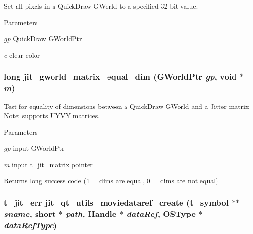 Set all pixels in a QuickDraw GWorld to a specified 32-\/bit value. 
\begin{DoxyParams}{Parameters}
\item[{\em gp}]QuickDraw GWorldPtr \item[{\em c}]clear color \end{DoxyParams}
\hypertarget{group__qtutilsmod_ga96b18f81671878671095be4b05443b11}{
\subsubsection[{jit\_\-gworld\_\-matrix\_\-equal\_\-dim}]{\setlength{\rightskip}{0pt plus 5cm}long jit\_\-gworld\_\-matrix\_\-equal\_\-dim (GWorldPtr {\em gp}, \/  void $\ast$ {\em m})}}
\label{group__qtutilsmod_ga96b18f81671878671095be4b05443b11}


Test for equality of dimensions between a QuickDraw GWorld and a Jitter matrix Note: supports UYVY matrices. 
\begin{DoxyParams}{Parameters}
\item[{\em gp}]input GWorldPtr \item[{\em m}]input t\_\-jit\_\-matrix pointer\end{DoxyParams}
\begin{DoxyReturn}{Returns}
long success code (1 = dims are equal, 0 = dims are not equal) 
\end{DoxyReturn}
\hypertarget{group__qtutilsmod_ga3a890ee4b21dcc12fd498103c0064025}{
\subsubsection[{jit\_\-qt\_\-utils\_\-moviedataref\_\-create}]{\setlength{\rightskip}{0pt plus 5cm}t\_\-jit\_\-err jit\_\-qt\_\-utils\_\-moviedataref\_\-create ({\bf t\_\-symbol} $\ast$$\ast$ {\em sname}, \/  short $\ast$ {\em path}, \/  Handle $\ast$ {\em dataRef}, \/  OSType $\ast$ {\em dataRefType})}}
\label{group__qtutilsmod_ga3a890ee4b21dcc12fd498103c0064025}


